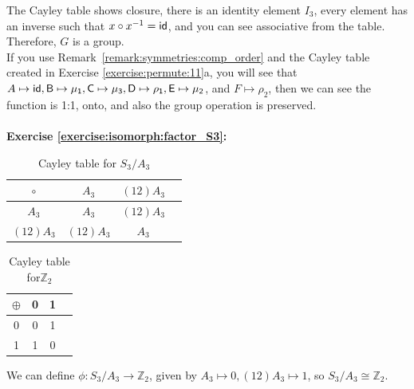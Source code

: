 \noindent
The Cayley table shows closure, there is an identity element $I_3$, every element has an inverse such that $x \circ x^{-1} = \sf{id}$, and you can see associative from the table. Therefore, $G$ is a group.  
\\
If you use Remark~\ref{remark:symmetries:comp_order} and the Cayley table created in Exercise \ref{exercise:permute:11}a, you will see that $A \mapsto \sf{id}, B \mapsto \mu_1, C \mapsto \mu_3, D \mapsto \rho_1, E \mapsto \mu_2$, and $F \mapsto \rho_2$, then we can see the function is 1:1, onto, and also the group operation is preserved. 
\\
\\

\noindent\textbf{Exercise \ref{exercise:isomorph:factor_S3}:}
\begin{multicols}{2}
\begin{table}[H]
\caption{Cayley table for $S_3/A_3$}
{\small
\begin{center}
\begin{tabular}{c|ccc}
$\circ$ &$ A_3$ & $(12)A_3$  \\
\hline
$A_3$        &$A_3$ &$ (12)A_3$  \\
$(12)A_3$  & $(12)A_3$  &$A_3$   \\
\end{tabular}
\end{center}
}
\end{table}

\begin{table}[H]
\caption{Cayley table for${\mathbb Z}_2$}
{\small
\begin{center}
\begin{tabular}{c|ccc}
$\oplus$ & 0 & 1 \\

\hline
0 & 0 & 1 \\ 
1& 1 & 0 \\
\end{tabular}
\end{center}
}
\end{table}
\end{multicols}
\noindent We can define $\phi:S_3/A_3 \rightarrow {\mathbb Z}_2$,  given by  $A_3\mapsto 0,  (12)A_3 \mapsto 1$, so $S_3/A_3 \cong {\mathbb Z}_2$.
\\
\\

